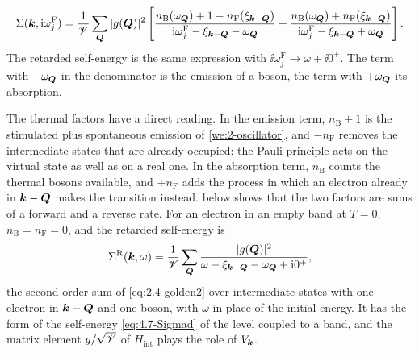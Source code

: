 \begin{keyresult}
\begin{equation}
  \Sigma(\bm{k},\mathrm{i}\omega^{\mathrm{F}}_j) = \frac1{\mathscr{V}}\sum_{\bm{Q}}|g(\bm{Q})|^2\left[\frac{n_{\mathrm{B}}(\omega_{\bm{Q}}) + 1 - n_{\mathrm{F}}(\xi_{\bm{k}-\bm{Q}})}{\mathrm{i}\omega^{\mathrm{F}}_j - \xi_{\bm{k}-\bm{Q}} - \omega_{\bm{Q}}} + \frac{n_{\mathrm{B}}(\omega_{\bm{Q}}) + n_{\mathrm{F}}(\xi_{\bm{k}-\bm{Q}})}{\mathrm{i}\omega^{\mathrm{F}}_j - \xi_{\bm{k}-\bm{Q}} + \omega_{\bm{Q}}}\right] .
  \label{eq:4.8-sigmaboson}
\end{equation}
The retarded self-energy is the same expression with $\ii\omega^{\mathrm{F}}_j \to \omega + \ii0^+$. The term with $-\omega_{\bm{Q}}$ in the denominator is the emission of a boson, the term with $+\omega_{\bm{Q}}$ its absorption.
\end{keyresult}
The thermal factors have a direct reading. In the emission term, $n_{\mathrm{B}} + 1$ is the stimulated plus spontaneous emission of \cref{we:2-oscillator}, and $-n_{\mathrm{F}}$ removes the intermediate states that are already occupied: the Pauli principle acts on the virtual state as well as on a real one. In the absorption term, $n_{\mathrm{B}}$ counts the thermal bosons available, and $+n_{\mathrm{F}}$ adds the process in which an electron already in $\bm{k} - \bm{Q}$ makes the transition instead.  below shows that the two factors are sums of a forward and a reverse rate. For an electron in an empty band at $T = 0$, $n_{\mathrm{B}} = n_{\mathrm{F}} = 0$, and the retarded self-energy is
\begin{equation*}
  \Sigma^{\mathrm{R}}(\bm{k},\omega) = \frac1{\mathscr{V}}\sum_{\bm{Q}}\frac{|g(\bm{Q})|^2}{\omega - \xi_{\bm{k}-\bm{Q}} - \omega_{\bm{Q}} + \mathrm{i}0^+} ,
\end{equation*}
the second-order sum of \cref{eq:2.4-golden2} over intermediate states with one electron in $\bm{k} - \bm{Q}$ and one boson, with $\omega$ in place of the initial energy. It has the form of the self-energy \cref{eq:4.7-Sigmad} of the level coupled to a band, and the matrix element $g/\sqrt {\mathscr{V}}$ of $H_{\mathrm{int}}$ plays the role of $V_{\bm{k}}$.

